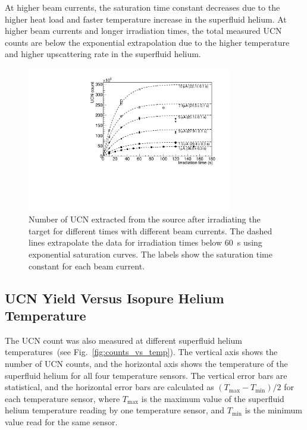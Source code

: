 At higher beam currents, the saturation time constant decreases due to
the higher heat load and faster temperature increase in the superfluid
helium. At higher beam currents and longer irradiation times, the
total measured UCN counts are below the exponential extrapolation due
to the higher temperature and higher upscattering rate in the
superfluid helium.

\begin{figure}[h!]
  \centering
  \includegraphics[width=0.8\textwidth]{UCNCounts_vs_irradTime.pdf}
  \caption[UCN yield versus target irradiation times]{Number of UCN
    extracted from the source after irradiating the target for
    different times with different beam currents. The dashed lines
    extrapolate the data for irradiation times below 60~s using
    exponential saturation curves. The labels show the saturation time
    constant for each beam current. }
  \label{fig:counts_vs_irrad}
\end{figure}


\subsection{UCN Yield Versus Isopure Helium Temperature}
The UCN count was also measured at different superfluid helium
temperatures~(see Fig.~\ref{fig:counts_vs_temp}). The vertical axis
shows the number of UCN counts, and the horizontal axis shows the
temperature of the superfluid helium for all four temperature
sensors. The vertical error bars are statistical, and the horizontal
error bars are calculated as $(T_{\mathrm{max}}-T_{\mathrm{min}})/2$
for each temperature sensor, where $T_{\mathrm{max}}$ is the maximum
value of the superfluid helium temperature reading by one temperature
sensor, and $T_{\mathrm{min}}$ is the minimum value read for the same
sensor.

